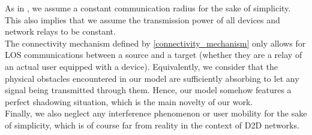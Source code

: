 \documentclass[conference]{IEEEtran}
\begin{document}
\indent As in \cite{glauche_continuum_2003}, we assume a constant communication radius for the sake of simplicity. This also implies that we assume the transmission power of all devices and network relays to be constant. \\
\indent The connectivity mechanism defined by \eqref{connectivity_mechanism} only allows for LOS communications between a source and a target (whether they are a relay of an actual user equipped with a device). Equivalently, we consider that the physical obstacles encountered in our model are sufficiently absorbing to let any signal being transmitted through them.  Hence, our model somehow features a perfect shadowing situation, which is the main novelty of our work. \\
\indent Finally, we also neglect any interference phenomenon or user mobility for the sake of simplicity, which is of course far from reality in the context of D2D networks. 
\end{document}
